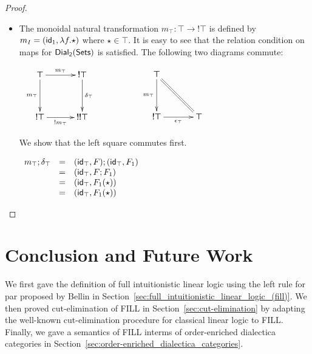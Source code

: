 \begin{proof}
\begin{center}
\begin{itemize}
    \item The monoidal natural transformation $m_{\top} : \top \to !\top$
      is defined by $m_{I} = (\mathsf{id}_1,\lambda f.\star)$ where $\star \in \top$. 
      It is easy to see that the relation condition
      on maps for $\mathsf{Dial_2}(\mathsf{Sets})$ is satisfied.  The following two diagrams
      commute:
      \begin{center}
        \begin{math}
          \begin{array}{lll}
            \bfig
            \square[\top`!\top`!\top`!!\top;m_\top`m_\top`\delta_\top`!m_\top]
            \efig
            &
              \,\,\,\,\,\,\,\,\,\,\,\,\,\,\,\,\,\,\,\,
            &
              \bfig
              \btriangle/->`=`->/[\top`!\top`\top;m_\top``\epsilon_{\top}]
           \efig
          \end{array}
        \end{math}
      \end{center}
      We show that the left square commutes first.  
      \begin{center}
        \begin{math}
          \begin{array}{lll}
            m_\top;\delta_\top 
            & = & (\mathsf{id}_\top, F);(\mathsf{id}_\top,F_1)\\
            & = & (\mathsf{id}_\top, F;F_1)\\
            & = & (\mathsf{id}_\top, F_1(\star))\\
            & = & (\mathsf{id}_\top, F_1(\star))\\
          \end{array}
        \end{math}
      \end{center}
    \end{itemize}    
  \end{center}
  
\end{proof}




\section{Conclusion and Future Work}
\label{sec:conclusion_and_future_work}

We first gave the definition of full intuitionistic linear logic using
the left rule for par proposed by Bellin in
Section~\ref{sec:full_intuitionistic_linear_logic_(fill)}.  We then
proved cut-elimination of FILL in Section~\ref{sec:cut-elimination} by
adapting the well-known cut-elimination procedure for classical linear
logic to FILL.  Finally, we gave a semantics of FILL interms of
order-enriched dialectica categories in
Section~\ref{sec:order-enriched_dialectica_categories}.

